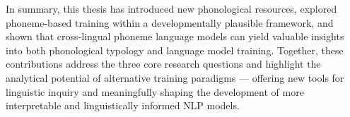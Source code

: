 In summary, this thesis has introduced new phonological resources, explored phoneme-based training within a developmentally plausible framework, and shown that cross-lingual phoneme language models can yield valuable insights into both phonological typology and language model training. Together, these contributions address the three core research questions and highlight the analytical potential of alternative training paradigms --- offering new tools for linguistic inquiry and meaningfully shaping the development of more interpretable and linguistically informed NLP models.






